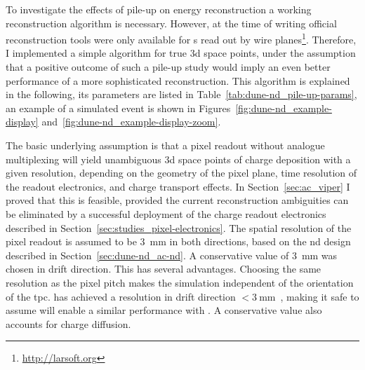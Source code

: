 To investigate the effects of pile-up on energy reconstruction a working reconstruction algorithm is necessary.
However, at the time of writing official reconstruction tools were only available for \lartpc{}s read out by wire planes\footnote{\url{http://larsoft.org}}.
Therefore, I implemented a simple algorithm for true \gls{3d} space points, under the assumption that a positive outcome of such a pile-up study would imply an even better performance of a more sophisticated reconstruction.
This algorithm is explained in the following, its parameters are listed in Table~\ref{tab:dune-nd_pile-up-params}, an example of a simulated event is shown in Figures~\ref{fig:dune-nd_example-display} and~\ref{fig:dune-nd_example-display-zoom}.

The basic underlying assumption is that a pixel readout without analogue multiplexing will yield unambiguous \gls{3d} space points of charge deposition with a given resolution, depending on the geometry of the pixel plane, time resolution of the readout electronics, and charge transport effects.
In Section~\ref{sec:ac_viper} I proved that this is feasible, provided the current reconstruction ambiguities can be eliminated by a successful deployment of the \larpix{} charge readout electronics described in Section~\ref{sec:studies_pixel-electronics}.
The spatial resolution of the pixel readout is assumed to be \SI{3}{\milli\metre} in both directions, based on the \gls{nd} design described in Section~\ref{sec:dune-nd_ac-nd}.
A conservative value of \SI{3}{\milli\meter} was chosen in drift direction.
This has several advantages.
Choosing the same resolution as the pixel pitch makes the simulation independent of the orientation of the \gls{tpc}.
\uboone{} has achieved a resolution in drift direction $< \SI{3}{\milli\metre}$~\cite{uboone}, making it safe to assume \larpix{} will enable a similar performance with \AC{}.
A conservative value also accounts for charge diffusion.

